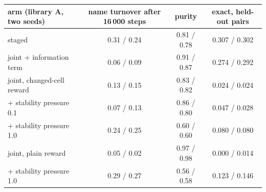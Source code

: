 \begin{tabular}{lccc}\toprule
arm (library A, two seeds) & name turnover after 16\,000 steps & purity & exact, held-out pairs \\ \midrule
staged & 0.31 / 0.24 & 0.81 / 0.78 & 0.307 / 0.302 \\
joint + information term & 0.06 / 0.09 & 0.91 / 0.87 & 0.274 / 0.292 \\
joint, changed-cell reward & 0.13 / 0.15 & 0.83 / 0.82 & 0.024 / 0.024 \\
\quad + stability pressure 0.1 & 0.07 / 0.13 & 0.86 / 0.80 & 0.047 / 0.028 \\
\quad + stability pressure 1.0 & 0.24 / 0.25 & 0.60 / 0.60 & 0.080 / 0.080 \\
joint, plain reward & 0.05 / 0.02 & 0.97 / 0.98 & 0.000 / 0.014 \\
\quad + stability pressure 1.0 & 0.29 / 0.27 & 0.56 / 0.58 & 0.123 / 0.146 \\
\bottomrule
\end{tabular}